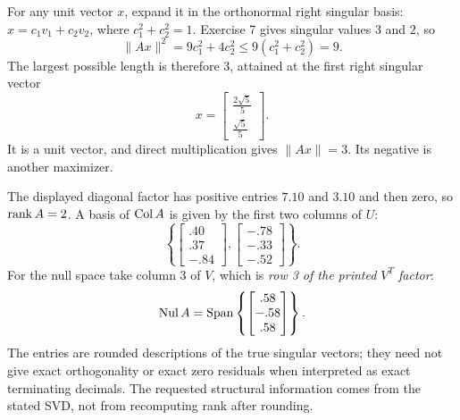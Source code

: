 For any unit vector $x$, expand it in the orthonormal right singular basis: $x=c_1v_1+c_2v_2$, where $c_1^2+c_2^2=1$. Exercise 7 gives singular values $3$ and $2$, so
\[
\|Ax\|^2=9c_1^2+4c_2^2\le9(c_1^2+c_2^2)=9.
\]
The largest possible length is therefore $3$, attained at the first right singular vector
\[x=\begin{bmatrix}\frac{2 \sqrt{5}}{5}\\\frac{\sqrt{5}}{5}\end{bmatrix}.\]
It is a unit vector, and direct multiplication gives $\|Ax\|=3$. Its negative is another maximizer.

 The displayed diagonal factor has positive entries $7.10$ and $3.10$ and then zero, so $\operatorname{rank} A=2$.
 A basis of $\operatorname{Col} A$ is given by the first two columns of $U$:
\[
\left\{\begin{bmatrix}.40\\.37\\-.84\end{bmatrix},
\begin{bmatrix}-.78\\-.33\\-.52\end{bmatrix}\right\}.
\]
For the null space take column 3 of $V$, which is \emph{row 3 of the printed $V^T$ factor}:
\[
\operatorname{Nul} A=\operatorname{Span}\left\{\begin{bmatrix}.58\\-.58\\.58\end{bmatrix}\right\}.
\]
The entries are rounded descriptions of the true singular vectors; they need not give exact orthogonality or exact zero residuals when interpreted as exact terminating decimals. The requested structural information comes from the stated SVD, not from recomputing rank after rounding.

